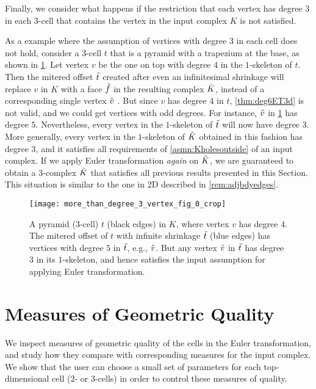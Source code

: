 Finally, we consider what happens if the restriction that each vertex has degree $3$ in each $3$-cell that contains the vertex in the input complex $K$ is not satisfied.
\begin{rem}\label{rem:3dETdeg4vtx}
  {\rm 
    As a example where the assumption of vertices with degree $3$ in each cell does not hold, consider a $3$-cell $t$ that is a pyramid with a trapezium at the base, as shown in  \cref{fig:mothde3ver}.
    Let vertex $v$ be the one on top with degree $4$ in the $1$-skeleton of $t$.
    Then the mitered offset $\tilde{t}$ created after even an infinitesimal shrinkage will replace $v$ in $K$ with a face $\tilde{f}$ in the resulting complex $\tilde{K}$, instead of a corresponding single vertex $\hat{v}$ \cite{AuWa2013,AuWa2016}.
    But since $v$ has degree $4$ in $t$, \cref{thm:deg6ET3d} is not valid, and we could get vertices with odd degrees.
    For instance, $\tilde{v}$ in \cref{fig:mothde3ver} has degree $5$.
    Nevertheless, every vertex in the $1$-skeleton of $\tilde{t}$ will now have degree $3$.
    More generally, every vertex in the $1$-skeleton of $\tilde{K}$ obtained in this fashion has degree $3$, and it satisfies all requirements of \cref{asmn:Kholesoutside} of an input complex.
    If we apply Euler transformation \emph{again} on $\tilde{K}$, we are guaranteed to obtain a $3$-complex $\hat{K}$ that satisfies all previous results presented in this Section.
    This situation is similar to the one in 2D described in \cref{rem:adjbdyedges}.
}	
\end{rem}
\begin{figure}[htp!]
  \centering
  \texttt{[image: more\_than\_degree\_3\_vertex\_fig\_0\_crop]}
  \caption{\label{fig:mothde3ver}
    A pyramid ($3$-cell) $t$ (black edges) in $K$, where vertex $v$ has degree $4$.
    The mitered offset of $t$ with infinite shrinkage $\tilde{t}$ (blue edges) has vertices with degree $5$ in $\tilde{t}$, e.g., $\tilde{v}$.
    But any vertex $\tilde{v}$ in $\tilde{t}$ has degree $3$ in its $1$-skeleton, and hence satisfies the input assumption for applying Euler transformation.}
\end{figure}
\section{Measures of Geometric Quality} \label{sec:geomqual}

We inspect measures of geometric quality of the cells in the Euler transformation, and study how they compare with corresponding measures for the input complex.
We show that the user can choose a small set of parameters for each top-dimensional cell ($2$- or $3$-cells) in order to control these measures of quality.

